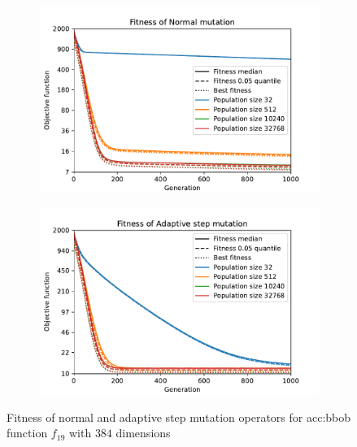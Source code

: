 \begin{figure}[ht!]
    \begin{subfigure}[t]{0.48\textwidth}
        \includegraphics[width=\textwidth]{img/runs/fitness_es_mutation_AddFromNormal_with_legend.pdf}
    \end{subfigure}
    \hfill
    \begin{subfigure}[t]{0.48\textwidth}
        \includegraphics[width=\textwidth]{img/runs/fitness_es_mutation_AdaptiveStep_with_legend.pdf}
    \end{subfigure}
    \caption[Fitness of mutation operators]{Fitness of normal and adaptive step mutation operators for \acrshort*{acc:bbob} function $f_{19}$ with $384$ dimensions}
    \label{fig:esmutfitness}
\end{figure}

